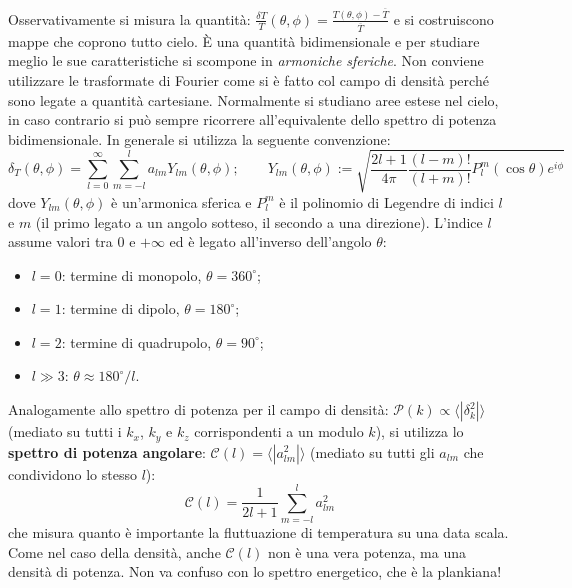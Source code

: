 \vspace{1em}
Osservativamente si misura la quantità: $\frac{\delta T }{T} (\theta, \phi)=\frac{T(\theta,\phi) - \overline{T}}{\overline{T}}$ e si costruiscono mappe che coprono tutto cielo. È una quantità bidimensionale e per studiare meglio le sue caratteristiche si scompone in \textit{armoniche sferiche}. Non conviene utilizzare le trasformate di Fourier come si è fatto col campo di densità perché sono legate a quantità cartesiane. Normalmente si studiano aree estese nel cielo, in caso contrario si può sempre ricorrere all'equivalente dello spettro di potenza bidimensionale. In generale si utilizza la seguente convenzione:
\begin{equation}
    \delta_T (\theta, \phi) = \sum_{l=0}^\infty \sum_{m=-l}^{l}a_{lm}Y_{lm} (\theta, \phi); \qquad Y_{lm} (\theta, \phi):= \sqrt{\frac{2l+1}{4\pi}\frac{(l-m)!}{(l+m)!}P_l^m (\cos\theta)e^{i\phi}}
\end{equation}
dove $Y_{lm}(\theta, \phi)$ è un'armonica sferica e $P_l^m$ è il polinomio di Legendre di indici $l$ e $m$ (il primo legato a un angolo sotteso, il secondo a una direzione). L'indice $l$ assume valori tra $0$ e $+\infty$ ed è legato all'inverso dell'angolo $\theta$:
\begin{itemize}
    \item $l=0$: termine di monopolo, $\theta=360^\circ $;
    \item $l=1$: termine di dipolo, $\theta=180^\circ $;
    \item $l=2$: termine di quadrupolo, $\theta=90^\circ $;
    \item $l \gg 3$: $\theta\approx 180^\circ /l$.
\end{itemize}

Analogamente allo spettro di potenza per il campo di densità: $\mathcal{P}(k)\propto \langle|\delta_k^2| \rangle $ (mediato su tutti i $k_x$, $k_y$ e $k_z$ corrispondenti a un modulo $k$), si utilizza lo \textbf{spettro di potenza angolare}: $\mathcal{C}(l) =  \langle|a_{lm}^2| \rangle$ (mediato su tutti gli $a_{lm}$ che condividono lo stesso $l$):
\begin{equation}
    \mathcal{C}(l)=\frac{1}{2l+1}\sum_{m=-l}^l a_{lm}^2
\end{equation}
che misura quanto è importante la fluttuazione di temperatura su una data scala. Come nel caso della densità, anche $\mathcal{C}(l)$ non è una vera potenza, ma una densità di potenza. Non va confuso con lo spettro energetico, che è la plankiana!

